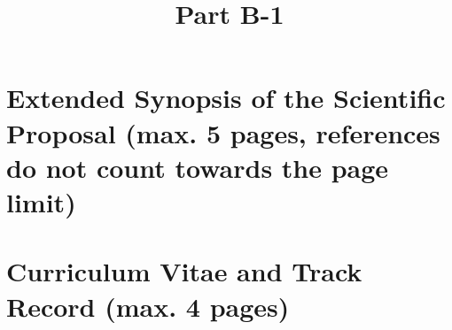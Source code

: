 \documentclass[11pt,nocomments,draftproposal]{erc-stg}
\title{Part B-1}
\author{}
\date{}
\begin{document}
\maketitle

\section{Extended Synopsis of the Scientific Proposal (max. 5 pages, references
do not count towards the page limit)}

\section{Curriculum Vitae and Track Record (max. 4 pages)}
\end{document}
